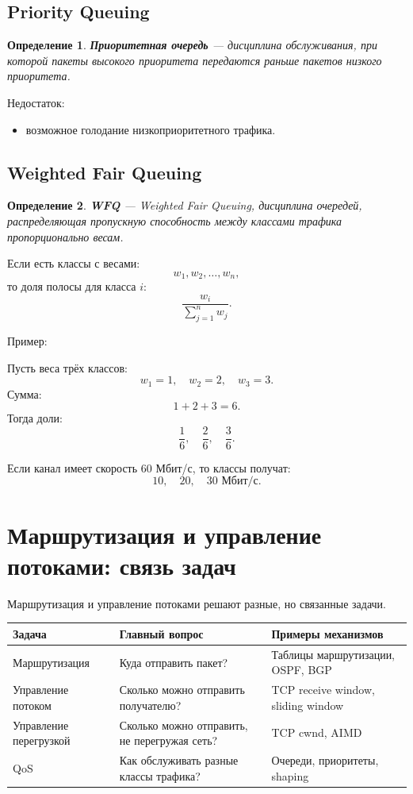\documentclass[12pt,a4paper]{article}
\newtheorem{definition}{Определение}
\begin{document}
\subsection{Priority Queuing}

\begin{definition}
\textbf{Приоритетная очередь} --- дисциплина обслуживания, при которой пакеты высокого приоритета передаются раньше пакетов низкого приоритета.
\end{definition}

Недостаток:
\begin{itemize}
    \item возможное голодание низкоприоритетного трафика.
\end{itemize}

\subsection{Weighted Fair Queuing}

\begin{definition}
\textbf{WFQ} --- Weighted Fair Queuing, дисциплина очередей, распределяющая пропускную способность между классами трафика пропорционально весам.
\end{definition}

Если есть классы с весами:
\[
w_1,w_2,\ldots,w_n,
\]
то доля полосы для класса $i$:
\[
\frac{w_i}{\sum_{j=1}^{n} w_j}.
\]

Пример:

Пусть веса трёх классов:
\[
w_1=1,\quad w_2=2,\quad w_3=3.
\]
Сумма:
\[
1+2+3=6.
\]
Тогда доли:
\[
\frac{1}{6},\quad \frac{2}{6},\quad \frac{3}{6}.
\]

Если канал имеет скорость 60 Мбит/с, то классы получат:
\[
10,\quad 20,\quad 30 \text{ Мбит/с}.
\]

\section{Маршрутизация и управление потоками: связь задач}

Маршрутизация и управление потоками решают разные, но связанные задачи.

\begin{center}
\begin{tabular}{|p{}|p{}|p{}|}
\hline
\textbf{Задача} & \textbf{Главный вопрос} & \textbf{Примеры механизмов} \\
\hline
Маршрутизация & Куда отправить пакет? & Таблицы маршрутизации, OSPF, BGP \\
\hline
Управление потоком & Сколько можно отправить получателю? & TCP receive window, sliding window \\
\hline
Управление перегрузкой & Сколько можно отправить, не перегружая сеть? & TCP cwnd, AIMD \\
\hline
QoS & Как обслуживать разные классы трафика? & Очереди, приоритеты, shaping \\
\hline
\end{tabular}
\end{center}
\end{document}
